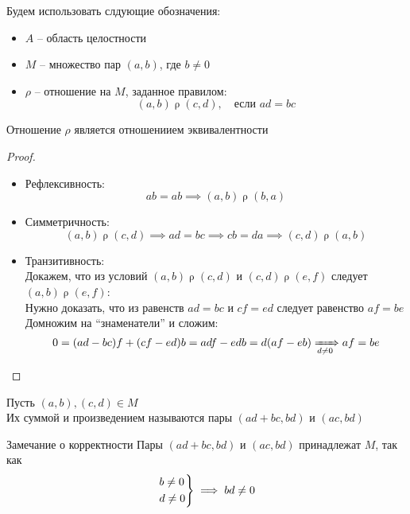\begin{notation}
	Будем использовать слдующие обозначения:
	\begin{itemize}
		\item $A$ -- область целостности
		\item $M$ -- множество пар $(a, b)$, где $b \ne 0$
		\item $\rho$ -- отношение на $M$, заданное правилом:
		$$ (a, b) \mathrel\rho (c, d), \quad \text{если } ad = bc $$
	\end{itemize}
\end{notation}

\begin{lemma}
	Отношение $\rho$ является отношениием эквивалентности
\end{lemma}

\begin{proof}
	\hfill
	\begin{itemize}
		\item Рефлексивность:
		$$ ab = ab \implies (a, b) \mathrel\rho (b, a) $$
		\item Симметричность:
		$$ (a, b) \mathrel\rho (c, d) \implies ad = bc \implies cb = da \implies (c, d) \mathrel\rho (a, b) $$
		\item Транзитивность: \\
		Докажем, что из условий $(a, b) \mathrel\rho (c, d)$ и $(c, d) \mathrel\rho (e, f)$ следует $(a, b) \mathrel\rho (e, f) $: \\
		Нужно доказать, что из равенств $ad = bc$ и $cf = ed$ следует равенство $af = be$ \\
		Домножим на ``знаменатели'' и сложим:
		$$ 0 = (ad - bc)f + (cf - ed)b = adf - edb = d(af - eb) \xRightarrow[d \ne 0]{} af = be $$
	\end{itemize}
\end{proof}

\begin{definition}
	Пусть $(a, b), (c, d) \in M$ \\
	Их суммой и произведением называются пары $(ad + bc, bd)$ и $(ac, bd)$
\end{definition}

\begin{undefthm}{Замечание о корректности}
	Пары $(ad + bc, bd)$ и $(ac, bd)$ принадлежат $M$, так как
	$$ \begin{rcases}
	   	b \ne 0 \\
		d \ne 0
	   \end{rcases} \implies bd \ne 0 $$
\end{undefthm}

